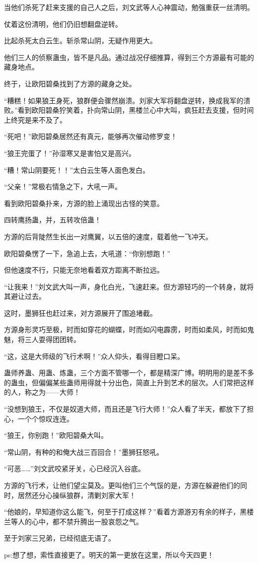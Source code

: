 \begin{this_body}
当他们杀死了赶来支援的自己人之后，刘文武等人心神震动，勉强重获一丝清明。

仗着这份清明，他们仍旧想翻盘逆转。

比起杀死太白云生。斩杀常山阴，无疑作用更大。

他们三人的侦察蛊虫，皆不是凡品。通过战况仔细推算，得到三个方源最有可能的藏身地点。

终于，让欧阳碧桑找到了方源的藏身之处。

“糟糕！如果狼王身死，狼群便会骤然崩溃。刘家大军将翻盘逆转，换成我军的溃败。”看到欧阳碧桑狞笑着，扑向常山阴，黑楼兰心中大叫，疯狂赶去支援，但时间上终究是来不及了。

“死吧！”欧阳碧桑居然还有真元，能够再次催动修罗变！

“狼王完蛋了！”孙湿寒又是害怕又是高兴。

“糟！常山阴要死！！”太白云生等人面色发白。

“父亲！”常极右情急之下，大吼一声。

看到欧阳碧桑扑来，方源的脸上涌现出古怪的笑意。

四转鹰扬蛊，并，五转攻倍蛊！

方源的后背陡然生长出一对鹰翼，以五倍的速度，载着他一飞冲天。

欧阳碧桑愣了一下，急追上去，大吼道：“你别想跑！”

但他速度不行，只能无奈地看着双方距离不断拉远。

“让我来！”刘文武大叫一声，身化白光，飞速赶来。但方源轻巧的一个转身，就将其避让过去。

这时，墨狮狂也赶过来，对方源展开了围追堵截。

方源身形灵巧至极，时而如穿花的蝴蝶，时而如闪电霹雳，时而如柔风，时而如鬼魅，将三人耍得团团转。

“这，这是大师级的飞行术啊！”众人仰头，看得目瞪口呆。

蛊师养蛊、用蛊、炼蛊，三个方面不管哪一个，都是精深广博。明明用的是差不多的蛊虫，但偏偏某些蛊师用得就十分出色，简直上升到艺术的层次。人们常把这样的人，称之为——大师！

“没想到狼王，不仅是奴道大师，而且还是飞行大师！”众人看了半天，都放下了担心，一个个惊叹连连。

“狼王，你别跑！”欧阳碧桑大叫。

“常山阴，有种的和俺大战三百回合！”墨狮狂怒吼。

“可恶……”刘文武咬紧牙关，心已经沉入谷底。

方源的飞行术，让他们望尘莫及。更叫他们三个气馁的是，方源在躲避他们的同时，居然还分心操纵狼群，清剿刘家大军！

“他娘的，早知道你这么能飞，何至于打成这样？”看着方源游刃有余的样子，黑楼兰等人的心中，都不禁升腾出一股哀怨之气。

至于刘家三兄弟，已经彻底无语了。

ps:想了想，索性直接更了。明天的第一更放在这里，所以今天四更！

\end{this_body}

